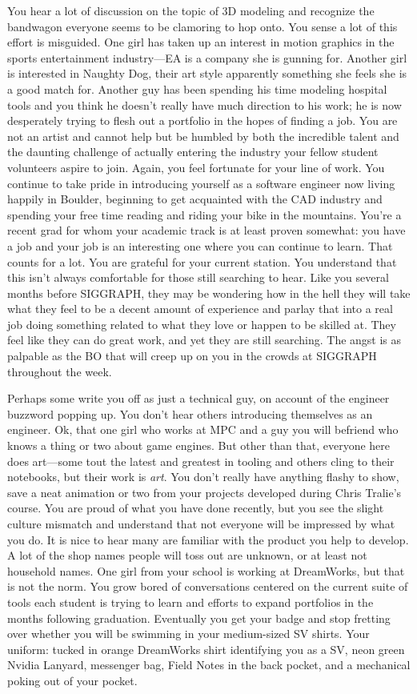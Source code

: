 \documentclass[../main.tex]{subfiles}
\begin{document}
You hear a lot of discussion on the topic of 3D modeling and recognize the bandwagon everyone seems to be clamoring to hop onto. You sense a lot of this effort is misguided. One girl has taken up an interest in motion graphics in the sports entertainment industry---EA is a company she is gunning for. Another girl is interested in Naughty Dog, their art style apparently something she feels she is a good match for. Another guy has been spending his time modeling hospital tools and you think he doesn't really have much direction to his work; he is now desperately trying to flesh out a portfolio in the hopes of finding a job. You are not an artist and cannot help but be humbled by both the incredible talent and the daunting challenge of actually entering the industry your fellow student volunteers aspire to join. Again, you feel fortunate for your line of work. You continue to take pride in introducing yourself as a software engineer now living happily in Boulder, beginning to get acquainted with the CAD industry and spending your free time reading and riding your bike in the mountains. You're a recent grad for whom your academic track is at least proven somewhat: you have a job and your job is an interesting one where you can continue to learn. That counts for a lot. You are grateful for your current station. You understand that this isn't always comfortable for those still searching to hear. Like you several months before SIGGRAPH, they may be wondering how in the hell they will take what they feel to be a decent amount of experience and parlay that into a real job doing something related to what they love or happen to be skilled at. They feel like they can do great work, and yet they are still searching. The angst is as palpable as the BO that will creep up on you in the crowds at SIGGRAPH throughout the week.

Perhaps some write you off as just a technical guy, on account of the engineer buzzword popping up. You don't hear others introducing themselves as an engineer. Ok, that one girl who works at MPC and a guy you will befriend who knows a thing or two about game engines. But other than that, everyone here does art---some tout the latest and greatest in tooling and others cling to their notebooks, but their work is \textit{art}. You don't really have anything flashy to show, save a neat animation or two from your projects developed during Chris Tralie's course. You are proud of what you have done recently, but you see the slight culture mismatch and understand that not everyone will be impressed by what you do. It is nice to hear many are familiar with the product you help to develop. A lot of the shop names people will toss out are unknown, or at least not household names. One girl from your school is working at DreamWorks, but that is not the norm. You grow bored of conversations centered on the current suite of tools each student is trying to learn and efforts to expand portfolios in the months following graduation. Eventually you get your badge and stop fretting over whether you will be swimming in your medium-sized SV shirts. Your uniform: tucked in orange DreamWorks shirt identifying you as a SV, neon green Nvidia Lanyard, messenger bag, Field Notes in the back pocket, and a mechanical poking out of your pocket.
\end{document}
